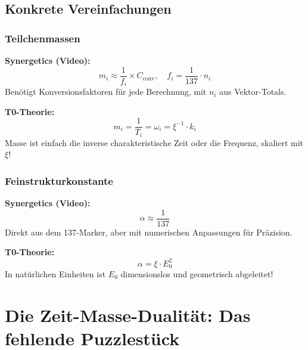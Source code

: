 \documentclass[12pt,a4paper]{article}
\newcommand{\xipar}{\xi}
\begin{document}
	\subsection{Konkrete Vereinfachungen}
	
	\subsubsection{Teilchenmassen}
	
	\textbf{Synergetics (Video):}
	\begin{equation}
		m_i \approx \frac{1}{f_i} \times C_{\text{conv}}, \quad f_i = \frac{1}{137} \cdot n_i
	\end{equation}
	Benötigt Konversionsfaktoren für jede Berechnung, mit $n_i$ aus Vektor-Totals.
	
	\textbf{T0-Theorie:}
	\begin{equation}
		\boxed{m_i = \frac{1}{T_i} = \omega_i = \xipar^{-1} \cdot k_i}
	\end{equation}
	Masse ist einfach die inverse charakteristische Zeit oder die Frequenz, skaliert mit $\xipar$!
	
	\subsubsection{Feinstrukturkonstante}
	
	\textbf{Synergetics (Video):}
	\begin{equation}
		\alpha \approx \frac{1}{137}
	\end{equation}
	Direkt aus dem 137-Marker, aber mit numerischen Anpassungen für Präzision.
	
	\textbf{T0-Theorie:}
	\begin{equation}
		\boxed{\alpha = \xipar \cdot E_0^2}
	\end{equation}
	In natürlichen Einheiten ist $E_0$ dimensionslos und geometrisch abgeleitet!
	
	\section{Die Zeit-Masse-Dualität: Das fehlende Puzzlestück}
	
\end{document}
